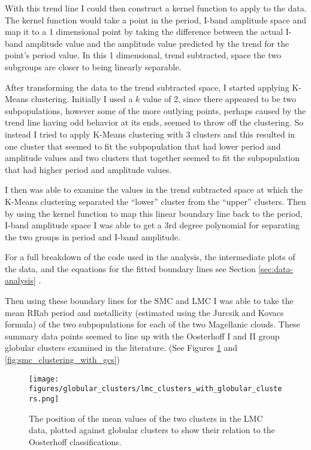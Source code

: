 \documentclass[]{article}
\begin{document}
With this trend line I could then construct a kernel function to apply to the data. The kernel function would take a point in the period, I-band amplitude space and map it to a 1 dimensional point by taking the  difference between the actual I-band amplitude value and the amplitude value predicted by the trend for the point's period value. In this 1 dimensional, trend subtracted, space the two subgroups are closer to being linearly separable.

After transforming the data to the trend subtracted space, I started applying K-Means clustering. Initially I used a $k$ value of 2, since there appeared to be two subpopulations, however some of the more outlying points, perhaps caused by the trend line having odd behavior at its ends, seemed to throw off the clustering. So instead I tried to apply K-Means clustering with 3 clusters and this resulted in one cluster that seemed to fit the subpopulation that had lower period and amplitude values and two clusters that together seemed to fit the subpopulation that had higher period and amplitude values.

I then was able to examine the values in the trend subtracted space at which the K-Means clustering separated the ``lower'' cluster from the ``upper'' clusters. Then by using the kernel function to map this linear boundary line back to the period, I-band amplitude space I was able to get a 3rd degree polynomial for separating the two groups in period and I-band amplitude.

For a full breakdown of the code used in the analysis, the intermediate plots of the data, and the equations for the fitted boundary lines see Section \ref{sec:data-analysis} .

Then using these boundary lines for the SMC and LMC I was able to take the mean RRab period and metallicity (estimated using the Jurcsik and Kovacs formula) of the two subpopulations for each of the two Magellanic clouds. These summary data points seemed to line up with the Oosterhoff I and II group globular clusters examined in the literature. (See Figures \ref{fig:lmc_clustering_with_gcs} and \ref{fig:smc_clustering_with_gcs})

\begin{figure}
	\centering
	\texttt{[image: figures/globular\_clusters/lmc\_clusters\_with\_globular\_clusters.png]}
	\caption{The position of the mean values of the two clusters in the LMC data, plotted against globular clusters to show their relation to the Oosterhoff classifications.}
	\label{fig:lmc_clustering_with_gcs}
\end{figure}
\end{document}
